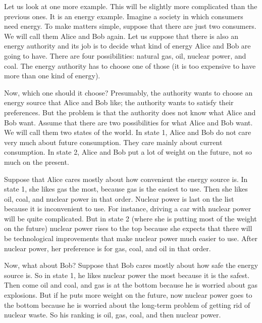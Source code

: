 \documentclass[12pt,a4paper]{article}
\newenvironment{original}{%
  \par\vspace{4pt}\noindent%
  \color{black}%
  \ignorespaces
}{%
  \par\vspace{2pt}%
}
\begin{document}
\begin{original}
Let us look at one more example. This will be slightly more complicated than the previous ones. It is an energy example. Imagine a society in which consumers need energy. To make matters simple, suppose that there are just two consumers. We will call them Alice and Bob again. Let us suppose that there is also an energy authority and its job is to decide what kind of energy Alice and Bob are going to have. There are four possibilities: natural gas, oil, nuclear power, and coal. The energy authority has to choose one of those (it is too expensive to have more than one kind of energy).

Now, which one should it choose? Presumably, the authority wants to choose an energy source that Alice and Bob like; the authority wants to satisfy their preferences. But the problem is that the authority does not know what Alice and Bob want. Assume that there are two possibilities for what Alice and Bob want. We will call them two states of the world. In state 1, Alice and Bob do not care very much about future consumption. They care mainly about current consumption. In state 2, Alice and Bob put a lot of weight on the future, not so much on the present.

Suppose that Alice cares mostly about how convenient the energy source is. In state 1, she likes gas the most, because gas is the easiest to use. Then she likes oil, coal, and nuclear power in that order. Nuclear power is last on the list because it is inconvenient to use. For instance, driving a car with nuclear power will be quite complicated. But in state 2 (where she is putting most of the weight on the future) nuclear power rises to the top because she expects that there will be technological improvements that make nuclear power much easier to use. After nuclear power, her preference is for gas, coal, and oil in that order.

Now, what about Bob? Suppose that Bob cares mostly about how safe the energy source is. So in state 1, he likes nuclear power the most because it is the safest. Then come oil and coal, and gas is at the bottom because he is worried about gas explosions. But if he puts more weight on the future, now nuclear power goes to the bottom because he is worried about the long-term problem of getting rid of nuclear waste. So his ranking is oil, gas, coal, and then nuclear power.


\end{original}
\end{document}
